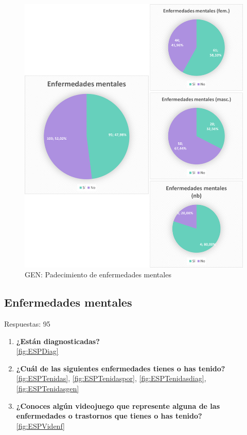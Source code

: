 \documentclass[12pt, a4paper,twoside,titlepage]{book}
\begin{document}
\begin{figure}
    \centering
    \includegraphics[width=1\linewidth]{ANEXO ESP/20AnexESPEnf}
    \caption{GEN: Padecimiento de enfermedades mentales}
    \label{fig:ESPEnf}
\end{figure}


\subsection{Enfermedades mentales}
Respuestas: 95
\begin{enumerate}[label=\textbf{\arabic*}.]
      \item \textbf{¿Están diagnosticadas? }\\
      \ref{fig:ESPDiag}
     \item \textbf{¿Cuál de las siguientes enfermedades tienes o has tenido?}\\
     \ref{fig:ESPTenidas},   \ref{fig:ESPTenidaspor},   \ref{fig:ESPTenidasdiag},   \ref{fig:ESPTenidasgen}
     \item \textbf{¿Conoces algún videojuego que represente alguna de las enfermedades o trastornos que tienes o has tenido?}\\
     \ref{fig:ESPVidenf}
\end{enumerate}
\end{document}
